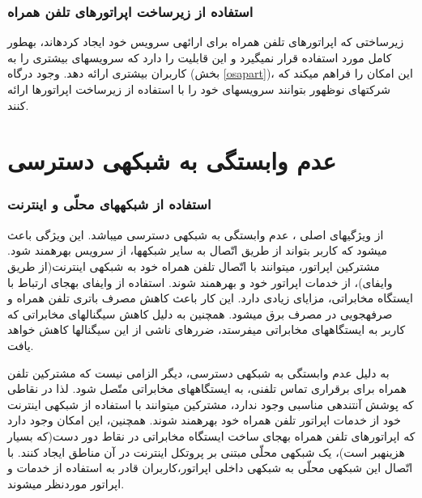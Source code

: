 \subsubsection{استفاده از زیرساخت اپراتورهای تلفن همراه}

زیرساختی که اپراتورهای تلفن همراه برای ارائه\nf ی سرویس خود ایجاد کرده\nf اند، به\nf طور کامل مورد استفاده قرار نمی\nf گیرد و این قابلیت را دارد که سرویس\nf های بیشتری را به کاربران بیشتری ارائه دهد. وجود درگاه (بخش \ref{osapart})، این امکان را فراهم می\nf کند که شرکت\nf های نوظهور بتوانند سرویس\nf های خود را با استفاده از زیرساخت اپراتورها ارائه کنند.

\nf 
\section{ عدم وابستگی به شبکه\nf ی دسترسی }

\subsubsection{استفاده از شبکه\nf های محلّی و اینترنت}

از ویژگی\nf های اصلی ، عدم وابستگی به شبکه\nf ی دسترسی می\nf باشد. این ویژگی باعث می\nf شود که کاربر بتواند از طریق اتّصال به سایر شبکه\nf ها، از سرویس  بهره\nf مند شود. مشترکین اپراتور، می\nf توانند با اتّصال تلفن همراه خود به شبکه\nf ی اینترنت(از طریق وای\nf فای)، از خدمات اپراتور خود و  بهره\nf مند شوند. استفاده از وای\nf فای به\nf جای ارتباط با ایستگاه مخابراتی، مزایای زیادی دارد. این کار باعث کاهش مصرف باتری تلفن همراه و صرفه\nf جویی در مصرف برق می\nf شود. همچنین به دلیل کاهش سیگنال\nf های مخابراتی که کاربر به ایستگاه\nf های مخابراتی می\nf فرستد، ضررهای ناشی از این سیگنال\nf ها کاهش خواهد یافت.

به دلیل عدم وابستگی  به شبکه\nf ی دسترسی، دیگر الزامی نیست که مشترکین تلفن همراه برای برقراری تماس تلفنی، به ایستگاه\nf های مخابراتی متّصل شود. لذا در نقاطی که پوشش آنتن\nf دهی مناسبی وجود ندارد، مشترکین می\nf توانند با استفاده از شبکه\nf ی اینترنت خود از خدمات اپراتور تلفن همراه خود بهره\nf مند شوند. همچنین، این امکان وجود دارد که اپراتورهای تلفن همراه به\nf جای ساخت ایستگاه مخابراتی در نقاط دور دست(که بسیار هزینه\nf بر است)، یک شبکه\nf ی محلّی مبتنی بر پروتکل اینترنت در آن مناطق ایجاد کنند. با اتّصال این شبکه\nf ی محلّی به شبکه\nf ی داخلی اپراتور،کاربران قادر به استفاده از خدمات  و اپراتور موردنظر می\nf شوند.


